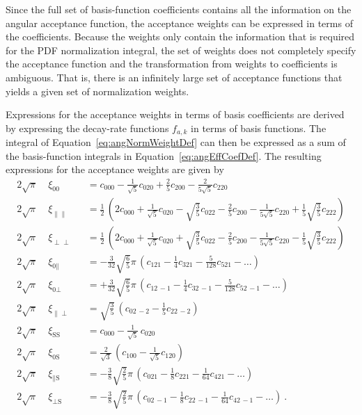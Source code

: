 Since the full set of basis-function coefficients contains all the information on the angular acceptance function, the acceptance weights
can be expressed in terms of the coefficients. Because the weights only contain the information that is required for the PDF normalization
integral, the set of weights does not completely specify the acceptance function and the transformation from weights to coefficients is
ambiguous. That is, there is an infinitely large set of acceptance functions that yields a given set of normalization weights.

Expressions for the acceptance weights in terms of basis coefficients are derived by expressing the decay-rate functions $f_{a,k}$ in terms
of basis functions. The integral of Equation~\ref{eq:angNormWeightDef} can then be expressed as a sum of the basis-function integrals in
Equation~\ref{eq:angEffCoefDef}. The resulting expressions for the acceptance weights are given by
\begin{equation}
  \label{eq:angCoefToWeight}
  \begin{alignedat}{2}
    2\sqrt{\pi}\; &\xi_{\text{00}} &
      &= c_{000} - \tfrac{1}{\sqrt{5}} c_{020} + \tfrac{2}{5} c_{200} - \tfrac{2}{5\sqrt{5}} c_{220} \\
    2\sqrt{\pi}\; &\xi_{\parallel\parallel} &
      &= \tfrac{1}{2}\,(2 c_{000} + \tfrac{1}{\sqrt{5}} c_{020} - \sqrt{\tfrac{3}{5}} c_{022} - \tfrac{2}{5} c_{200}
         - \tfrac{1}{5\sqrt{5}} c_{220} + \tfrac{1}{5}\sqrt{\tfrac{3}{5}} c_{222}) \\
    2\sqrt{\pi}\; &\xi_{\perp\perp} &
      &= \tfrac{1}{2}\,(2 c_{000} + \tfrac{1}{\sqrt{5}} c_{020} + \sqrt{\tfrac{3}{5}} c_{022} - \tfrac{2}{5} c_{200}
         - \tfrac{1}{5\sqrt{5}} c_{220} - \tfrac{1}{5}\sqrt{\tfrac{3}{5}} c_{222}) \\
    2\sqrt{\pi}\; &\xi_{\text{0}\parallel} &
      &= -\tfrac{3}{32}\sqrt{\tfrac{6}{5}}\pi\, (c_{121} - \tfrac{1}{4} c_{321} - \tfrac{5}{128} c_{521} - \ldots) \\
    2\sqrt{\pi}\; &\xi_{\text{0}\perp} &
      &= +\tfrac{3}{32}\sqrt{\tfrac{6}{5}}\pi\, (c_{12\,-1} - \tfrac{1}{4} c_{32\,-1} - \tfrac{5}{128} c_{52\,-1} - \ldots) \\
    2\sqrt{\pi}\; &\xi_{\parallel\perp} &
      &= \sqrt{\tfrac{3}{5}}\, (c_{02\,-2} - \tfrac{1}{5} c_{22\,-2}) \\
    2\sqrt{\pi}\; &\xi_{\text{SS}} &
      &= c_{000} - \tfrac{1}{\sqrt{5}}\,c_{020} \\
    2\sqrt{\pi}\; &\xi_{\text{0S}} &
      &= \tfrac{2}{\sqrt{3}}\, (c_{100} - \tfrac{1}{\sqrt{5}} c_{120}) \\
    2\sqrt{\pi}\; &\xi_{\parallel\text{S}} &
      &= -\tfrac{3}{8}\sqrt{\tfrac{2}{5}}\pi\, (c_{021} - \tfrac{1}{8} c_{221} - \tfrac{1}{64} c_{421} - \ldots) \\
    2\sqrt{\pi}\; &\xi_{\perp\text{S}} &
      &= -\tfrac{3}{8}\sqrt{\tfrac{2}{5}}\pi\, (c_{02\,-1} - \tfrac{1}{8} c_{22\,-1} - \tfrac{1}{64} c_{42\,-1} - \ldots) \ .
  \end{alignedat}
\end{equation}

